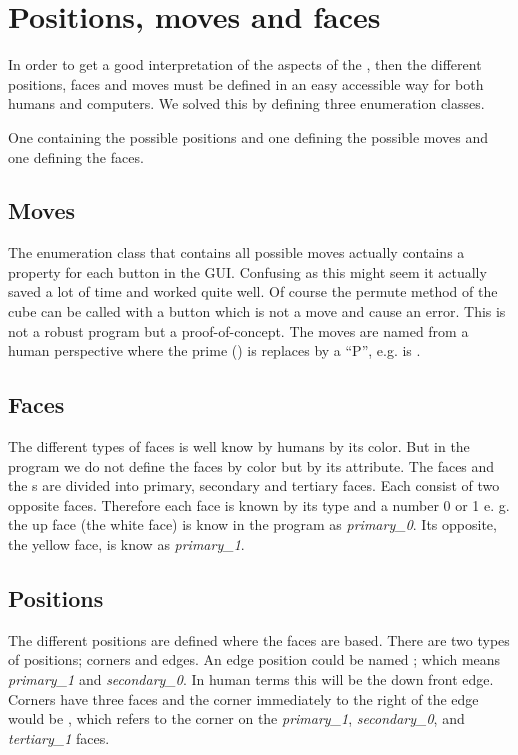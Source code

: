 \section{Positions, moves and faces}
In order to get a good interpretation of the aspects of the \cube{}, then the different positions, faces and moves must be defined in an easy accessible way for both humans and computers. We solved this by defining three enumeration classes. 

One containing the possible positions and one defining the possible moves and one defining the faces.

\subsection{Moves}
The enumeration class that contains all possible moves actually contains a property for each button in the GUI. Confusing as this might seem it actually saved a lot of time and worked quite well. Of course the permute method of the cube can be called with a button which is not a move and cause an error. This is not a robust program but a proof-of-concept. 
The moves are named from a human perspective where the prime () is replaces by a ``P'', e.g.  is .

\subsection{Faces}
The different types of faces is well know by humans by its color.
But in the program we do not define the faces by color but by its \facelet{} attribute. 
The faces and the \facelet{}s are divided into primary, secondary and tertiary faces. 
Each consist of two opposite faces. Therefore each face is known by its type and a number 0 or 1 e. g. the up face (the white face) is know in the program as \textit{primary\_0}.
Its opposite, the yellow face, is know as \textit{primary\_1}. 

\subsection{Positions}
The different positions are defined where the faces are based. There are two types of positions; corners and edges.
An edge position could be named ; which means \textit{primary\_1} and \textit{secondary\_0}.
In human terms this will be the down front edge.
Corners have three faces and the corner immediately to the right of the edge would be , which refers to the corner on the \textit{primary\_1}, \textit{secondary\_0}, and \textit{tertiary\_1} faces.
